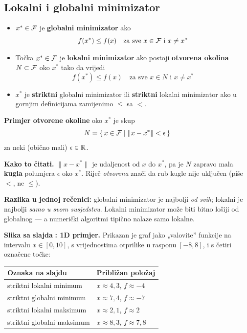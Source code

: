\subsection{Lokalni i globalni minimizator}

\begin{definicija}[Terminologija]
\begin{itemize}
  \item $x^{*} \in \mathcal{F}$ je \textbf{globalni minimizator} ako
        \[
        f(x^{*}) \le f(x) \quad\text{za sve } x \in \mathcal{F} \text{ i } x \ne x^{*}
        \]
  \item Točka $x^{*} \in \mathcal{F}$ je \textbf{lokalni minimizator} ako postoji
        \textbf{otvorena okolina} $N \subset \mathcal{F}$ oko $x^{*}$ tako da vrijedi
        \[
        f(x^{*}) \le f(x) \quad\text{za sve } x \in N \text{ i } x \ne x^{*}
        \]
  \item $x^{*}$ je \textbf{striktni} globalni minimizator ili \textbf{striktni}
        lokalni minimizator ako u gornjim definicijama zamijenimo $\le$ sa $<$.
\end{itemize}
\end{definicija}

\textbf{Primjer otvorene okoline} oko $x^{*}$ je skup
\[
N = \{\, x \in \mathcal{F} \mid \|x - x^{*}\| < \epsilon \,\}
\]
za neki (obično mali) $\epsilon \in \mathbb{R}$.

\textbf{Kako to čitati.} $\|x - x^{*}\|$ je udaljenost od $x$ do $x^{*}$, pa je
$N$ zapravo mala \textbf{kugla} polumjera $\epsilon$ oko $x^{*}$. Riječ
\emph{otvorena} znači da rub kugle nije uključen (piše $<$, ne $\le$).

\textbf{Razlika u jednoj rečenici:} globalni minimizator je najbolji
\emph{od svih}; lokalni je najbolji \emph{samo u svom susjedstvu}. Lokalni
minimizator može biti bitno lošiji od globalnog --- a numerički algoritmi
tipično nalaze samo lokalne.

\textbf{Slika sa slajda} \textbf{: 1D primjer.} Prikazan je graf jako
„valovite” funkcije na intervalu $x \in [0, 10]$, s vrijednostima otprilike u
rasponu $[-8, 8]$, i s četiri označene točke:

\begin{center}
\begin{tabular}{ll}
\toprule
\textbf{Oznaka na slajdu} & \textbf{Približan položaj} \\
\midrule
striktni lokalni minimum & $x \approx 4{,}3$, $f \approx -4$ \\
striktni globalni minimum & $x \approx 7{,}4$, $f \approx -7$ \\
striktni lokalni maksimum & $x \approx 2{,}1$, $f \approx 2$ \\
striktni globalni maksimum & $x \approx 8{,}3$, $f \approx 7{,}8$ \\
\bottomrule
\end{tabular}
\end{center}

